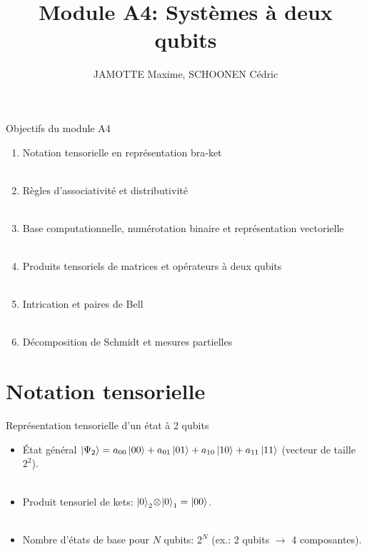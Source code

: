 \documentclass[aspectratio=169,12pt]{beamer}
\title[Module A4]{Module A4: Systèmes à deux qubits}
\author{JAMOTTE Maxime, SCHOONEN Cédric}
\institute{Digital Learning Hub}
\date{}
\begin{document}
\begin{frame}
  \titlepage
\end{frame}

\begin{frame}{Objectifs du module A4}
  \begin{enumerate}[<+->]
    \item Notation tensorielle en représentation bra-ket
    \\~\\
    \item Règles d'associativité et distributivité
    \\~\\
    \item Base computationnelle, numérotation binaire et représentation vectorielle
    \\~\\
    \item Produits tensoriels de matrices et opérateurs à deux qubits
    \\~\\
    \item Intrication et paires de Bell
    \\~\\
    \item Décomposition de Schmidt et mesures partielles
  \end{enumerate}
\end{frame}

\section{Notation tensorielle}

\begin{frame}{Représentation tensorielle d'un état à 2 qubits}
  \begin{itemize}[<+->]
    \item État général $\ket{\Psi_2} = a_{00}\ket{00}+a_{01}\ket{01}+a_{10}\ket{10}+a_{11}\ket{11}$ (vecteur de taille $2^2$).
    \\~\\
    \item Produit tensoriel de kets: $\ket{0}_2\!\otimes\!\ket{0}_1=\ket{00}$.
    \\~\\
    \item Nombre d'états de base pour $N$ qubits: $2^N$ (ex.: 2 qubits $\rightarrow$ 4 composantes).
  \end{itemize}
\end{frame}
\end{document}
